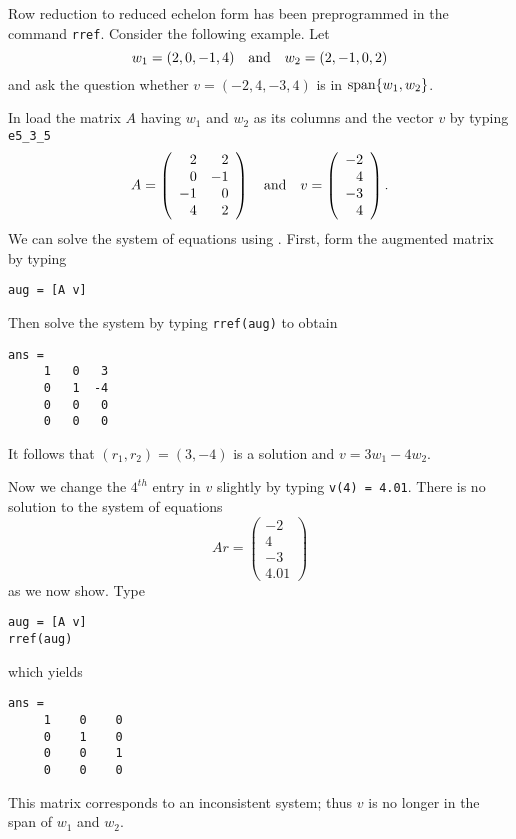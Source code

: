 \documentclass{ximera}
\begin{document}
Row reduction to reduced echelon form
has been preprogrammed in the
\Matlab command {\tt rref}.   Consider the
following example.  Let
\begin{equation}  \label{e:w1w2}
     w_1=(2,0,-1,4) \quad\mbox{and}\quad w_2=(2,-1,0,2)
\end{equation}
and ask the question whether $v=(-2,4,-3,4)$ is in ${\rm span}\{w_1,w_2\}$.

In \Matlab load the matrix $A$ having $w_1$ and
$w_2$ as its columns and the vector $v$ by typing {\tt e5\_3\_5}
\begin{equation*}  \label{e:Aandv}
A=\left(\begin{array}{rr} 2 & 2 \\ 0 & -1 \\ -1 & 0 \\ 4 & 2
\end{array}\right) \quad\mbox{and}\quad
v=\left(\begin{array}{r} -2 \\ 4 \\ -3 \\ 4 \end{array}\right).
\end{equation*}%
We can solve the system of equations using \Matlabp.
First, form the augmented matrix by typing
\begin{verbatim}
aug = [A v]
\end{verbatim}
Then solve the system by typing {\tt rref(aug)} to obtain
\begin{verbatim}
ans =
     1   0   3
     0   1  -4
     0   0   0
     0   0   0
\end{verbatim}
It follows that $(r_1,r_2)=(3,-4)$ is a solution and $v=3w_1-4w_2$.

Now we change the $4^{th}$ entry in $v$ slightly by typing
{\tt v(4) = 4.01}.  There is no solution to the system of equations
\[
Ar = \left(\begin{array}{r} -2 \\ 4 \\ -3 \\ 4.01
\end{array}\right)
\]
as we now show.  Type
\begin{verbatim}
aug = [A v]
rref(aug)
\end{verbatim}
which yields
\begin{verbatim}
ans =
     1    0    0
     0    1    0
     0    0    1
     0    0    0
\end{verbatim}
This matrix corresponds to an inconsistent system;
thus $v$ is no longer in the span of $w_1$ and $w_2$.
\end{document}
